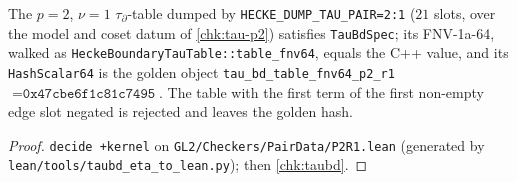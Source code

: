 \begin{theorem}[\texttt{obl:taubdry} (i)--(iv) on the real golden $p=2$ table]\label{chk:taubd-p2}
  \leanok
  The $p=2$, $\nu=1$ $\tau_\partial$-table dumped by \texttt{HECKE\_DUMP\_TAU\_PAIR=2:1} ($21$ slots, over the model and coset
  datum of \ref{chk:tau-p2}) satisfies \texttt{TauBdSpec}; its FNV-1a-64, walked as \texttt{HeckeBoundaryTauTable::table\_fnv64},
  equals the C++ value, and its \texttt{HashScalar64} is the golden object \texttt{tau\_bd\_table\_fnv64\_p2\_r1}
  $=\texttt{0x47cbe6f1c81c7495}$. The table with the first term of the first non-empty edge slot negated is rejected and
  leaves the golden hash.
\end{theorem}
\begin{proof}
  \leanok
  \texttt{decide +kernel} on \texttt{GL2/Checkers/PairData/P2R1.lean} (generated by \texttt{lean/tools/taubd\_eta\_to\_lean.py});
  then \ref{chk:taubd}.
\end{proof}

